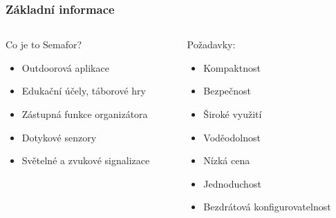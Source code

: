 \documentclass[%
  12pt,       				%
	t,                  %
	aspectratio=1610,   %
	unicode,						%
]{beamer}				    	%
\begin{document}
\disablenavigationsymbols

\maketitle

\begin{frame} 
	\frametitle{Základní informace}
	\begin{columns}[T] 								%
		\begin{column}{0.5\textwidth}		%
			Co je to Semafor?
			\begin{itemize}
				\item Outdoorová aplikace
				\item Edukační účely, táborové hry
				\item Zástupná funkce organizátora
				\item Dotykové senzory
				\item Světelné a zvukové signalizace
			\end{itemize}
		\end{column}
		\begin{column}{0.5\textwidth}		%
				Požadavky:
					\begin{itemize}
						\item Kompaktnost
						\item Bezpečnost
						\item Široké využití
						\item Voděodolnost
						\item Nízká cena
						\item Jednoduchost
						\item Bezdrátová konfigurovatelnost
					\end{itemize}
		\end{column}
	\end{columns}	
\end{frame}
\end{document}
